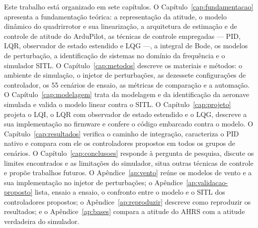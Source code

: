 Este trabalho está organizado em sete capítulos. O
Capítulo~\ref{cap:fundamentacao} apresenta a fundamentação teórica: a
representação da atitude, o modelo dinâmico do quadrirrotor e sua
linearização, a arquitetura de estimação e de controle de atitude do
ArduPilot, as técnicas de controle empregadas --- PID, LQR, observador de
estado estendido e LQG ---, a integral de Bode, os modelos de perturbação, a
identificação de sistemas no domínio da frequência e o simulador SITL. O
Capítulo~\ref{cap:metodos} descreve os materiais e métodos: o ambiente de
simulação, o injetor de perturbações, as dezessete configurações de
controlador, os 55 cenários de ensaio, as métricas de comparação e a
automação. O Capítulo~\ref{cap:modelagem} trata da modelagem e da
identificação da aeronave simulada e valida o modelo linear contra o SITL. O
Capítulo~\ref{cap:projeto} projeta o LQI, o LQR com observador de estado
estendido e o LQG, descreve a sua implementação no firmware e confere o
código embarcado contra o modelo. O Capítulo~\ref{cap:resultados} verifica o
caminho de integração, caracteriza o PID nativo e compara com ele os
controladores propostos em todos os grupos de cenários. O
Capítulo~\ref{cap:conclusoes} responde à pergunta de pesquisa, discute os
limites encontrados e as limitações do simulador, situa outras técnicas de
controle e propõe trabalhos futuros. O Apêndice~\ref{ap:vento} reúne os
modelos de vento e a sua implementação no injetor de perturbações; o
Apêndice~\ref{ap:validacao-proposto} lista, ensaio a ensaio, o confronto entre o modelo
e o SITL dos controladores propostos; o Apêndice~\ref{ap:reproduzir} descreve
como reproduzir os resultados; e o Apêndice~\ref{ap:bases} compara a
atitude do AHRS com a atitude verdadeira do simulador.
